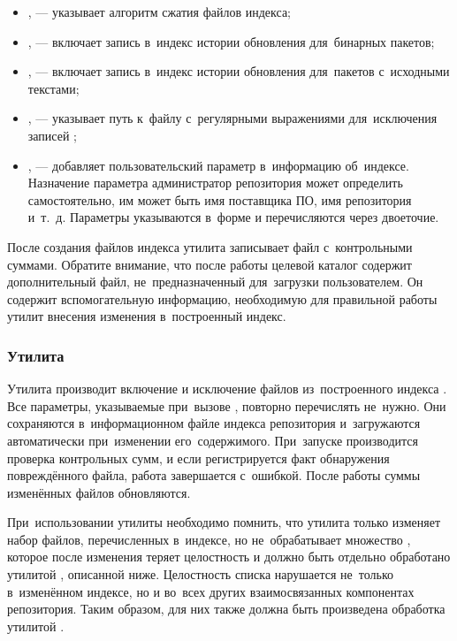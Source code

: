 \begin{itemize}

\item {
,  --- указывает алгоритм сжатия файлов индекса;
}

\item {
,  --- включает запись в~индекс истории обновления для~бинарных пакетов;
}

\item {
,  --- включает запись в~индекс истории обновления для~пакетов с~исходными текстами;
}

\item {
,  --- указывает путь к~файлу с~регулярными выражениями для~исключения записей \requires;
}

\item {
,  --- добавляет пользовательский параметр в~информацию об~индексе.
Назначение параметра администратор репозитория может определить самостоятельно,
им может быть имя поставщика ПО, имя репозитория и~т.~д. 
Параметры указываются в~форме  и перечисляются через двоеточие.
}

\end{itemize}

После создания файлов индекса утилита записывает файл с~контрольными суммами.
Обратите внимание, что после работы целевой каталог содержит дополнительный файл, не~предназначенный для~загрузки пользователем.
Он содержит вспомогательную информацию, необходимую для правильной работы утилит внесения изменения в~построенный индекс.

\subsubsection{Утилита }

Утилита  производит включение и исключение файлов из~построенного индекса \ds.
Все параметры, указываемые при~вызове , повторно перечислять не~нужно.
Они сохраняются в~информационном файле индекса репозитория и~загружаются автоматически при~изменении   его~содержимого.
При~запуске  производится проверка контрольных сумм, и если регистрируется факт обнаружения повреждённого файла, работа завершается с~ошибкой.
После работы суммы изменённых файлов обновляются.

При~использовании утилиты  необходимо помнить, что утилита только изменяет набор файлов, перечисленных в~индексе, но не~обрабатывает множество \provides,
которое после изменения теряет целостность и должно быть отдельно обработано утилитой , описанной ниже.
Целостность списка \provides нарушается не~только в~изменённом индексе, но и во~всех других взаимосвязанных компонентах репозитория.
Таким образом, для них также должна быть произведена обработка утилитой .

